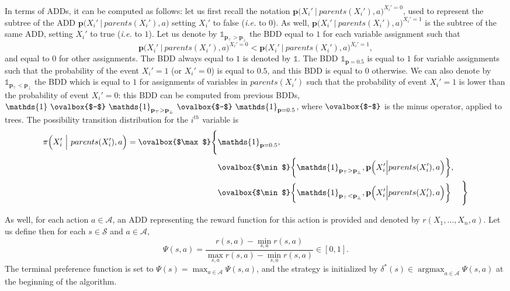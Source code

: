 In terms of ADDs, it can be computed as follows:
let us first recall the notation  $\textbf{p} \Big( X_i' \ \Big\vert \ parents(X_i'),a \Big)^{X_i'=0}$,
used to represent the subtree of the ADD
$\textbf{p} \Big( X_i' \ \Big\vert \ parents(X_i'),a \Big)$ setting $X_i'$ to false (\textit{i.e.} to $0$).
As well, $\textbf{p} \Big( X_i' \ \Big\vert \ parents(X_i'),a \Big)^{X_i'=1}$ is the subtree of the same ADD, setting $X_i'$ to true (\textit{i.e.} to $1$).
Let us denote by $\mathds{1}_{\textbf{p}_{\top}>\textbf{p}_{\bot}}$ 
the BDD equal to $1$ for each variable assignment such that %
\[ \textbf{p} \Big( X_i' \ \Big\vert \ parents(X_i'),a \Big)^{X_i'=0} < \textbf{p} \Big( X_i' \ \Big\vert \ parents(X_i'),a \Big)^{X_i'=1}, \]
and equal to $0$ for other assignments.
The BDD always equal to $1$ is denoted by $\mathds{1}$. 
The BDD $\mathds{1}_{\textbf{p}=0.5}$ is equal to $1$
for variable assignments such that the probability of the event $X_i'=1$ (or $X_i'=0$) 
is equal to $0.5$, and this BDD is equal to $0$ otherwise.
We can also denote by
$\mathds{1}_{\textbf{p}_{\top}<\textbf{p}_{\bot}} $
the BDD which is equal to $1$ for assignments of variables in $parents(X_i')$ 
such that the probability of event $X_i' = 1$
is lower than the probability of event $X_i'=0$:
this BDD can be computed from previous BDDs,
$ \mathds{1} \ \ovalbox{$-$} \ \mathds{1}_{\textbf{p}_{\top}>\textbf{p}_{\bot}} \ \ovalbox{$-$} \ \mathds{1}_{\textbf{p}=0.5}$,
where $\ovalbox{$-$}$ is the minus operator, applied to trees.
The possibility transition distribution for the $i^{th}$ variable is
\begin{eqnarray*}
\pi \Big( X_i' \ \Big\vert \ parents(X_i'),a \Big) = \ovalbox{$\max$} \Bigg\{ 	& \mathds{1}_{\textbf{p}=0.5}, 														& \\
				& \ovalbox{$\min$} \bigg\{ \mathds{1}_{\textbf{p}_{\top}>\textbf{p}_{\bot}}, \textbf{p} \Big( X_i' \Big\vert parents(X_i'), a \Big) \bigg\} , 	& \\
				& \ovalbox{$\min$} \bigg\{ \mathds{1}_{\textbf{p}_{\top}<\textbf{p}_{\bot}}  , \textbf{p} \Big( X_i' \Big\vert parents(X_i'), a \Big) \bigg\} 	& 	\Bigg\} 
\end{eqnarray*}

As well, for each action $a \in \mathcal{A}$, 
an ADD representing the reward function for this action 
is provided and denoted by $r(X_1,\ldots,X_n,a)$. 
Let us define then for each $s \in \mathcal{S}$ and $a \in \mathcal{A}$,
\[ \Psi(s,a) = \frac{ r(s,a) - \min_{s,a} r(s,a) }{ \max_{s,a} r(s,a) - \min_{s,a} r(s,a)} \in [0,1]. \]
The terminal preference function is set to $\Psi(s) = \max_{a \in \mathcal{A}} \Psi(s,a)$,
and the strategy is initialized by $\delta^*(s) \in \operatorname*{argmax}_{a \in \mathcal{A}} \Psi(s,a)$
at the beginning of the algorithm.

